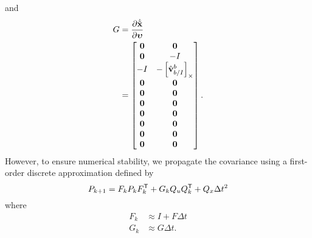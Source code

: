 and
\begin{align}
  G &= \frac{ \partial \dot{\tilde{\boldsymbol{\mathrm{x}}}} }{ \partial \boldsymbol{\mathrm{\upsilon}} } \\
    &=
    \begin{bmatrix}
      \boldsymbol{\mathrm{0}} & \boldsymbol{\mathrm{0}} \\
      \boldsymbol{\mathrm{0}} & -I \\
      -I & -\left[ \hat{\boldsymbol{\mathrm{v}}}_{b/I}^b \right]_{\times} \\
      \boldsymbol{\mathrm{0}} & \boldsymbol{\mathrm{0}} \\
      \boldsymbol{\mathrm{0}} & \boldsymbol{\mathrm{0}} \\
      \boldsymbol{\mathrm{0}} & \boldsymbol{\mathrm{0}} \\
      \boldsymbol{\mathrm{0}} & \boldsymbol{\mathrm{0}} \\
      \boldsymbol{\mathrm{0}} & \boldsymbol{\mathrm{0}} \\
      \boldsymbol{\mathrm{0}} & \boldsymbol{\mathrm{0}} \\
      \boldsymbol{\mathrm{0}} & \boldsymbol{\mathrm{0}} 
    \end{bmatrix}.
\end{align}
However, to ensure numerical stability, we propagate the covariance using a first-order discrete approximation
defined by
\begin{equation}
  P_{k+1} = F_{k} P_{k} F_{k}^{\mathsf{T}} + G_k Q_u Q_k^{\mathsf{T}} + Q_x \Delta
  t^2
\end{equation}
where
\begin{align}
  F_k &\approx I + F \Delta t \\
  G_k &\approx G \Delta t.
\end{align}


